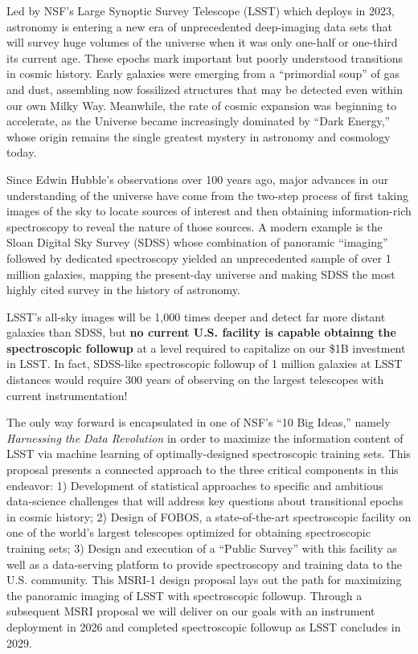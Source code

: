 \documentclass[oneside,11pt]{amsart}
\begin{document}
Led by NSF's Large Synoptic Survey Telescope (LSST) which deploys in 2023, astronomy is entering a new era of
unprecedented deep-imaging data sets that will survey huge volumes of the universe when it was only one-half or
one-third its current age.  These epochs mark important but poorly understood transitions in cosmic history. Early
galaxies were emerging from a ``primordial soup'' of gas and dust, assembling now fossilized structures that may be
detected even within our own Milky Way.  Meanwhile, the rate of cosmic expansion was beginning to accelerate, as the
Universe became increasingly dominated by ``Dark Energy,'' whose origin remains the single greatest mystery in
astronomy and cosmology today.

Since Edwin Hubble's observations over 100 years ago, major advances in our understanding of the universe have come
from the two-step process of first taking images of the sky to locate sources of interest and then obtaining
information-rich spectroscopy to reveal the nature of those sources.  A modern example is the Sloan Digital Sky Survey
(SDSS) whose combination of panoramic ``imaging'' followed by dedicated spectroscopy yielded an unprecedented sample of
over 1 million galaxies, mapping the present-day universe and making SDSS the most highly cited survey in the history
of astronomy.


LSST's all-sky images will be 1,000 times deeper and detect far more distant galaxies than SDSS, but {\bf no current
U.S. facility is capable obtainng the spectroscopic followup} at a level required to capitalize on our \$1B investment
in LSST.  In fact, SDSS-like spectroscopic followup of 1 million galaxies at LSST distances would require 300 years of
observing on the largest telescopes with current instrumentation!

The only way forward is encapsulated in one of NSF's ``10 Big Ideas,'' namely \emph{Harnessing the Data Revolution} in
order to maximize the information content of LSST via machine learning of optimally-designed spectroscopic training
sets.  This proposal presents a connected approach to the three critical components in this endeavor: 1) Development of
statistical approaches to specific and ambitious data-science challenges that will address key questions about
transitional epochs in cosmic history; 2) Design of FOBOS, a state-of-the-art spectroscopic facility on one of the
world's largest telescopes optimized for obtaining spectroscopic training sets; 3) Design and execution
of a ``Public Survey'' with this facility as well as a data-serving platform to provide spectroscopy and training data
to the U.S. community.  This MSRI-1 design proposal lays out the path for maximizing the panoramic imaging of LSST with
spectroscopic followup.  Through a subsequent MSRI proposal we will deliver on our goals with an instrument deployment
in 2026 and completed spectroscopic followup as LSST concludes in 2029.
\end{document}
